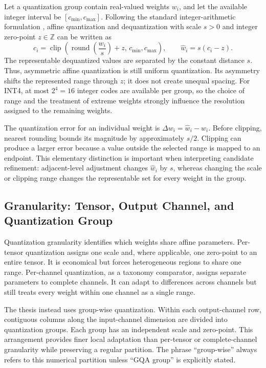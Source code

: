 Let a quantization group contain real-valued weights $w_i$, and let the available integer interval be $[c_{\min},c_{\max}]$. Following the standard integer-arithmetic formulation \cite{jacob2018quantization}, affine quantization and dequantization with scale $s>0$ and integer zero-point $z\in\mathbb{Z}$ can be written as
\begin{equation}
c_i =
\operatorname{clip}\left(
\operatorname{round}\left(\frac{w_i}{s}\right)+z,\,
c_{\min},c_{\max}
\right),
\qquad
\hat{w}_i=s(c_i-z).
\end{equation}
The representable dequantized values are separated by the constant distance $s$. Thus, asymmetric affine quantization is still uniform quantization. Its asymmetry shifts the represented range through $z$; it does not create unequal spacing. For INT4, at most $2^4=16$ integer codes are available per group, so the choice of range and the treatment of extreme weights strongly influence the resolution assigned to the remaining weights.

The quantization error for an individual weight is $\Delta w_i=\hat{w}_i-w_i$. Before clipping, nearest rounding bounds its magnitude by approximately $s/2$. Clipping can produce a larger error because a value outside the selected range is mapped to an endpoint. This elementary distinction is important when interpreting candidate refinement: adjacent-level adjustment changes $\hat{w}_i$ by $s$, whereas changing the scale or clipping range changes the representable set for every weight in the group.

\subsection{Granularity: Tensor, Output Channel, and Quantization Group}

Quantization granularity identifies which weights share affine parameters. Per-tensor quantization assigns one scale and, where applicable, one zero-point to an entire tensor. It is economical but forces heterogeneous regions to share one range. Per-channel quantization, as a taxonomy comparator, assigns separate parameters to complete channels. It can adapt to differences across channels but still treats every weight within one channel as a single range.

The thesis instead uses group-wise quantization. Within each output-channel row, contiguous columns along the input-channel dimension are divided into quantization groups. Each group has an independent scale and zero-point. This arrangement provides finer local adaptation than per-tensor or complete-channel granularity while preserving a regular partition. The phrase ``group-wise'' always refers to this numerical partition unless ``GQA group'' is explicitly stated.

